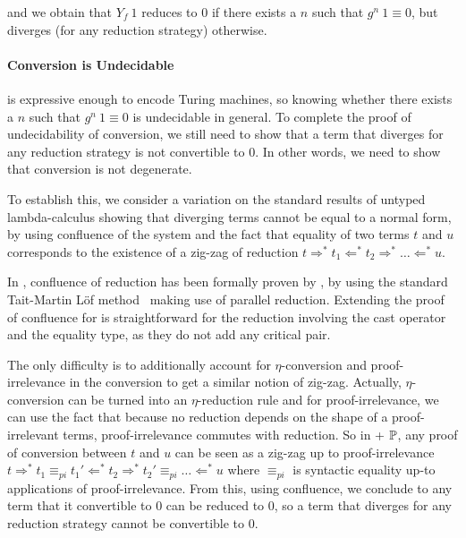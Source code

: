and 
% 
we obtain that \( Y_f\ 1 \) reduces to 0 if there exists a \( n \) such that
\( g^n\ 1 \equiv 0 \), but diverges (for any reduction strategy) otherwise.


\paragraph{Conversion is Undecidable}

\SetoidCC is expressive enough to encode Turing machines, so
knowing whether there exists a \( n \) such that \( g^n\ 1 \equiv 0 \) is
undecidable in general.
%
To complete the proof of undecidability of conversion, we still need
to show that a term that diverges for any reduction strategy is not
convertible to $0$. In other words, we need to show that conversion is
not degenerate.

To establish this, we consider a variation on the standard results of untyped
lambda-calculus  showing that diverging terms
cannot be equal to a normal form, by using confluence of the system
and the fact that equality of two terms $t$ and $u$ corresponds to the
existence of a zig-zag of reduction $t \Rightarrow^* t_1 \Leftarrow^*
t_2\Rightarrow^*\dots \Leftarrow^* u$.

In \CIC, confluence of reduction has been formally proven by
, by using the standard Tait-Martin Löf
method~ making use of parallel
reduction.
%
Extending the proof of confluence for \SetoidCC is straightforward for
the reduction involving the cast operator and the equality type, as
they do not add any critical pair.

The only difficulty is to additionally account for $\eta$-conversion
and proof-irrelevance in the conversion to get a similar notion of
zig-zag.
%
Actually, $\eta$-conversion can be turned into an
$\eta$-reduction rule and for proof-irrelevance, we can use the fact
that because no reduction depends on the shape of a proof-irrelevant
terms, proof-irrelevance commutes with reduction.
So in \SetoidCC + $\mathbb{P}$, any proof of conversion between $t$ and $u$
can be seen as a zig-zag up to proof-irrelevance
%
$t \Rightarrow^* t_1 \equiv_{pi} t_1' \Leftarrow^*
t_2\Rightarrow ^* t_2' \equiv_{pi} \dots \Leftarrow^* u$ where $\equiv_{pi}$ is syntactic
equality up-to applications of proof-irrelevance.
%
From this, using confluence, we conclude to any term that it convertible to $0$ can be
reduced to $0$, so a term that diverges for any reduction strategy
cannot be convertible to $0$.

